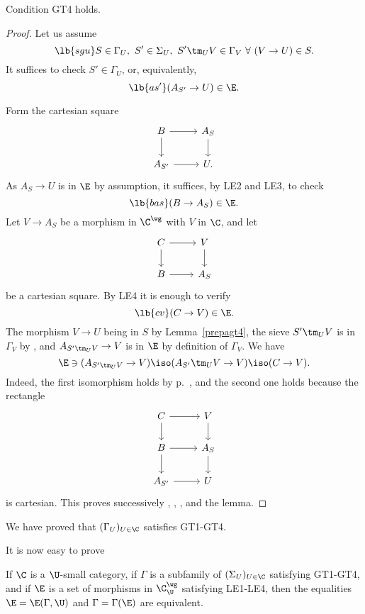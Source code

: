 \documentclass[12pt]{article}
\theoremstyle{remark}
\theoremstyle{definition}
\begin{document}
\begin{lem}
Condition GT4 holds.
\end{lem}

\begin{proof} 
Let us assume 
%
\begin{equation}\lb{sgu}
S\in\Gamma_U,\ S'\in\Sigma_U,\ S'\tm_UV\in\Gamma_V\ \forall\ (V\to U)\in S.
\end{equation}
%
It suffices to check $S'\in\Gamma_U$, or, equivalently, 
%
\begin{equation}\lb{as'}
(A_{S'}\to U)\in\E.
\end{equation}

Form the cartesian square 
$$
\begin{tikzcd}
B\ar{r}\ar{d}&A_S\ar{d}\\ 
A_{S'}\ar{r}&U.
\end{tikzcd}
$$ 
As $A_S\to U$ is in $\E$ by assumption, it suffices, by LE2 and LE3, to check  
%
\begin{equation}\lb{bas}
(B\to A_S)\in\E.
\end{equation}
%
Let $V\to A_S$ be a morphism in $\C^\wg$ with $V$ in $\C$, and let 
$$
\begin{tikzcd}
C\ar{r}\ar{d}&V\ar{d}\\ 
B\ar{r}&A_S
\end{tikzcd}
$$ 
be a cartesian square. By LE4 it is enough to verify 
%
\begin{equation}\lb{cv}
(C\to V)\in\E.
\end{equation} 
% 
The morphism $V\to U$ being in $S$ by Lemma~\ref{prepagt4}, the sieve $S'\tm_UV$ is in $\Gamma_V$ by , and $A_{S'\tm_UV}\to V$ is in $\E$ by definition of $\Gamma_V$. We have 
$$
\E\ni(A_{S'\tm_UV}\to V)\iso(A_{S'}\tm_UV\to V)\iso(C\to V).
$$ 
Indeed, the first isomorphism holds by  p.~, and the second one holds because the rectangle 
$$
\begin{tikzcd}
C\ar{r}\ar{d}&V\ar{d}\\ 
B\ar{r}\ar{d}&A_S\ar{d}\\ 
A_{S'}\ar{r}&U
\end{tikzcd}
$$ 
is cartesian. This proves successively , , , and the lemma.  
\end{proof}

We have proved that $(\Gamma_U)_{U\in\C}$ satisfies GT1-GT4. 

It is now easy to prove 

\begin{thm}
If $\C$ is a $\U$-small category, if $\Gamma$ is a subfamily of $(\Sigma_U)_{U\in\C}$ satisfying GT1-GT4, and if $\E$ is a set of morphisms in $\C^\wg_\U$ satisfying LE1-LE4, then the equalities $\E=\E(\Gamma,\U)$ and $\Gamma=\Gamma(\E)$ are equivalent.
\end{thm}
\end{document}
